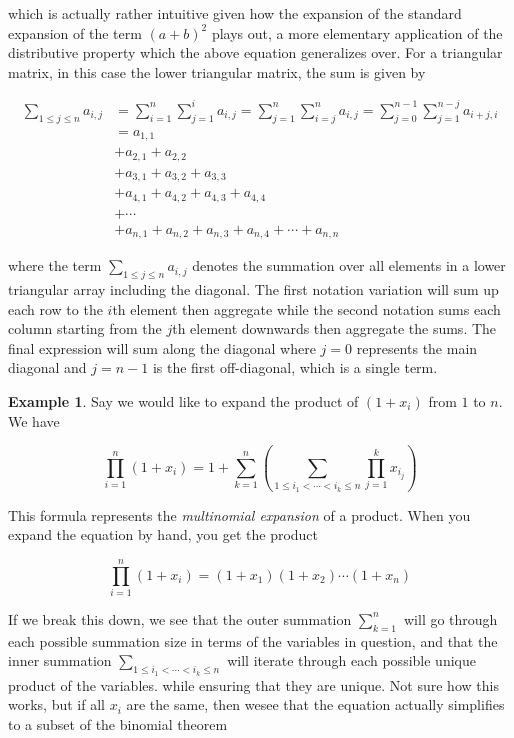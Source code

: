 \documentclass[12pt]{article}
\theoremstyle{definition}
\newtheorem*{example}{Example}
\begin{document}
which is actually rather intuitive given how the expansion of the standard expansion of the term $(a+b)^2$ plays out, a more elementary application of the distributive property which the above equation generalizes over. For a triangular matrix, in this case the lower triangular matrix, the sum is given by

\begin{align*}
    \sum_{1 \leq j \leq n}^{} a_{i,j} &= \sum_{i=1}^{n} \sum_{j=1}^{i} a_{i, j} = 
    \sum_{j=1}^{n} \sum_{i=j}^{n} a_{i, j} = 
    \sum_{j=0}^{n-1} \sum_{j=1}^{n-j} a_{i+j, i} \\
    &= a_{1, 1} \\
    & + a_{2, 1} + a_{2, 2}  \\
    & + a_{3, 1} + a_{3, 2} + a_{3, 3} \\
    & + a_{4, 1} + a_{4, 2} + a_{4, 3} + a_{4, 4} \\
    & + \cdots \\
    & + a_{n, 1} + a_{n, 2} + a_{n, 3} + a_{n, 4} + \cdots + a_{n, n}
\end{align*}

where the term $\sum_{1 \leq j \leq n}^{} a_{i,j}$ denotes the summation over all elements in a lower triangular array including the diagonal. The first notation variation will sum up each row to the $i$th element then aggregate while the second notation sums each column starting from the $j$th element downwards then aggregate the sums. The final expression will sum along the diagonal where $j=0$ represents the main diagonal and $j=n-1$ is the first off-diagonal, which is a single term. 

\begin{example}
    Say we would like to expand the product of $\left(1 + x_i\right)$ from $1$ to $n$. We have 

    $$\prod_{i=1}^{n} \left(1 + x_i\right) = 1 + \sum_{k=1}^{n} \left(\sum_{1 \leq i_1 < \cdots < i_k \leq n} \prod_{j=1}^{k} x_{i_j}\right)$$
\end{example}

This formula represents the \textit{multinomial expansion} of a product. When you expand the equation by hand, you get the product

$$\prod_{i=1}^{n} \left(1 + x_i\right) = (1 + x_1)(1 + x_2)\cdots(1 + x_n)$$

If we break this down, we see that the outer summation $\sum_{k=1}^{n}$ will go through each possible summation size in terms of the variables in question, and that the inner summation $\sum_{1 \leq i_1 < \cdots < i_k \leq n}$ will iterate through each possible unique product of the variables. while ensuring that they are unique. Not sure how this works, but if all $x_i$ are the same, then wesee that the equation actually simplifies to a subset of the binomial theorem 
\end{document}
